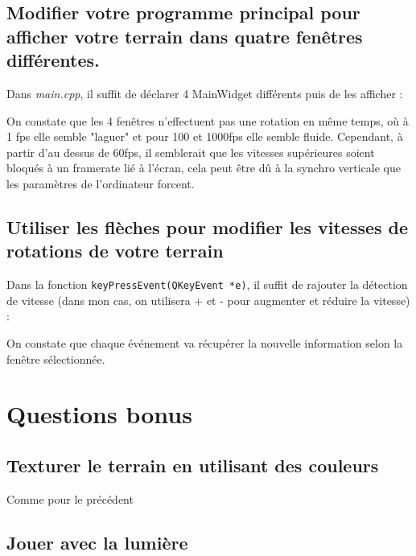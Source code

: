 \documentclass[a4paper,11pt]{report}
\begin{document}
	\subsection{Modifier votre programme principal pour afficher votre terrain dans quatre fenêtres différentes.}
	Dans \textit{main.cpp}, il suffit de déclarer 4 MainWidget différents puis de les afficher :
			
	On constate que les 4 fenêtres n'effectuent pas une rotation en même temps, où à 1 fps elle semble "laguer" et pour 100 et 1000fps elle semble fluide.
	\hfill
	\pagebreak
	Cependant, à partir d'au dessus de 60fps, il semblerait que les vitesses supérieures soient bloqués à un framerate lié à l'écran, cela peut être dû à la synchro verticale que les paramètres de l'ordinateur forcent.
	
	\subsection{Utiliser les flèches pour modifier les vitesses de rotations de votre terrain}
	Dans la fonction \texttt{keyPressEvent(QKeyEvent *e)}, il suffit de rajouter la détection de vitesse (dans mon cas, on utilisera + et - pour augmenter et réduire la vitesse) :
	
	On constate que chaque événement va récupérer la nouvelle information selon la fenêtre sélectionnée.
    
    \pagebreak
    \section{Questions bonus}
    \subsection{Texturer le terrain en utilisant des couleurs}
    Comme pour le précédent
    
    \subsection{Jouer avec la lumière}
\end{document}
